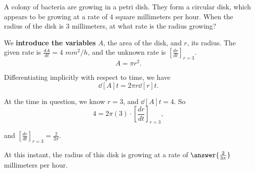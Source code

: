 \documentclass{ximera}
\author{Steven Gubkin\and Nela Lakos}
\begin{document}
\begin{exercise}



A colony of bacteria are growing in a petri dish.  They form a
circular disk, which appears to be growing at a rate of $4$ square
millimeters per hour.  When the radius of the disk is $3$ millimeters,
at what rate is the radius growing?

\begin{hint}
  We \textbf{introduce the variables} $A$, the area of the disk, and $r$,  its radius.  The given rate is $\frac{dA}{dt}=4$ $mm^2/h$, and the unknown rate is $\left[\frac{dr}{dt}\right]_{r=3}$.
  \[
  A = \pi r^2.
  \]
\end{hint}

\begin{hint}
  Differentiating implicitly with respect to time, we have
  \[
  \dd[A]{t} = 2\pi r \dd[r]{t}.
  \]
\end{hint}

\begin{hint}
  At the time in question, we know $r = 3$, and $\dd[A]{t} = 4$.
  So
  \[
  4 = 2 \pi (3)\cdot\left[\frac{dr}{dt}\right]_{r=3},
  \]

and $\left[\frac{dr}{dt}\right]_{r=3} = \frac{2}{3\pi}$.
\end{hint}

\begin{prompt}
  At this instant, the radius of this disk is growing at a rate
  of $\answer{\frac{2}{3\pi}}$ millimeters per hour.
\end{prompt}

\end{exercise}
\end{document}
